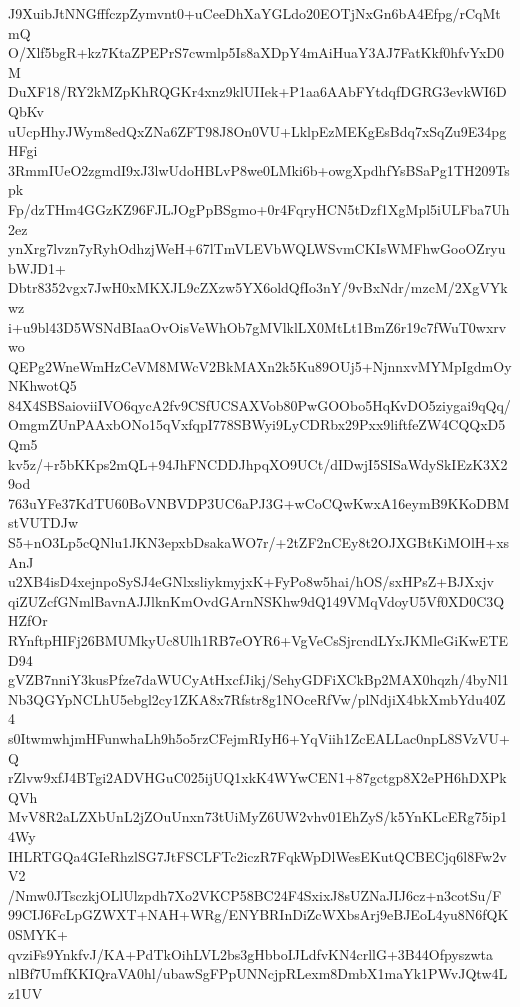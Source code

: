 J9XuibJtNNGfffczpZymvnt0+uCeeDhXaYGLdo20EOTjNxGn6bA4Efpg/rCqMtmQ
O/Xlf5bgR+kz7KtaZPEPrS7cwmlp5Is8aXDpY4mAiHuaY3AJ7FatKkf0hfvYxD0M
DuXF18/RY2kMZpKhRQGKr4xnz9klUIIek+P1aa6AAbFYtdqfDGRG3evkWI6DQbKv
uUcpHhyJWym8edQxZNa6ZFT98J8On0VU+LklpEzMEKgEsBdq7xSqZu9E34pgHFgi
3RmmIUeO2zgmdI9xJ3lwUdoHBLvP8we0LMki6b+owgXpdhfYsBSaPg1TH209Tspk
Fp/dzTHm4GGzKZ96FJLJOgPpBSgmo+0r4FqryHCN5tDzf1XgMpl5iULFba7Uh2ez
ynXrg7lvzn7yRyhOdhzjWeH+67lTmVLEVbWQLWSvmCKIsWMFhwGooOZryubWJD1+
Dbtr8352vgx7JwH0xMKXJL9cZXzw5YX6oldQfIo3nY/9vBxNdr/mzcM/2XgVYkwz
i+u9bl43D5WSNdBIaaOvOisVeWhOb7gMVlklLX0MtLt1BmZ6r19c7fWuT0wxrvwo
QEPg2WneWmHzCeVM8MWcV2BkMAXn2k5Ku89OUj5+NjnnxvMYMpIgdmOyNKhwotQ5
84X4SBSaioviiIVO6qycA2fv9CSfUCSAXVob80PwGOObo5HqKvDO5ziygai9qQq/
OmgmZUnPAAxbONo15qVxfqpI778SBWyi9LyCDRbx29Pxx9liftfeZW4CQQxD5Qm5
kv5z/+r5bKKps2mQL+94JhFNCDDJhpqXO9UCt/dIDwjI5SISaWdySkIEzK3X29od
763uYFe37KdTU60BoVNBVDP3UC6aPJ3G+wCoCQwKwxA16eymB9KKoDBMstVUTDJw
S5+nO3Lp5cQNlu1JKN3epxbDsakaWO7r/+2tZF2nCEy8t2OJXGBtKiMOlH+xsAnJ
u2XB4isD4xejnpoSySJ4eGNlxsliykmyjxK+FyPo8w5hai/hOS/sxHPsZ+BJXxjv
qiZUZcfGNmlBavnAJJlknKmOvdGArnNSKhw9dQ149VMqVdoyU5Vf0XD0C3QHZfOr
RYnftpHIFj26BMUMkyUc8Ulh1RB7eOYR6+VgVeCsSjrcndLYxJKMleGiKwETED94
gVZB7nniY3kusPfze7daWUCyAtHxcfJikj/SehyGDFiXCkBp2MAX0hqzh/4byNl1
Nb3QGYpNCLhU5ebgl2cy1ZKA8x7Rfstr8g1NOceRfVw/plNdjiX4bkXmbYdu40Z4
s0ItwmwhjmHFunwhaLh9h5o5rzCFejmRIyH6+YqViih1ZcEALLac0npL8SVzVU+Q
rZlvw9xfJ4BTgi2ADVHGuC025ijUQ1xkK4WYwCEN1+87gctgp8X2ePH6hDXPkQVh
MvV8R2aLZXbUnL2jZOuUnxn73tUiMyZ6UW2vhv01EhZyS/k5YnKLcERg75ip14Wy
IHLRTGQa4GIeRhzlSG7JtFSCLFTc2iczR7FqkWpDlWesEKutQCBECjq6l8Fw2vV2
/Nmw0JTsczkjOLlUlzpdh7Xo2VKCP58BC24F4SxixJ8sUZNaJIJ6cz+n3cotSu/F
99CIJ6FcLpGZWXT+NAH+WRg/ENYBRInDiZcWXbsArj9eBJEoL4yu8N6fQK0SMYK+
qvziFs9YnkfvJ/KA+PdTkOihLVL2bs3gHbboIJLdfvKN4crllG+3B44Ofpyszwta
nlBf7UmfKKIQraVA0hl/ubawSgFPpUNNcjpRLexm8DmbX1maYk1PWvJQtw4Lz1UV
